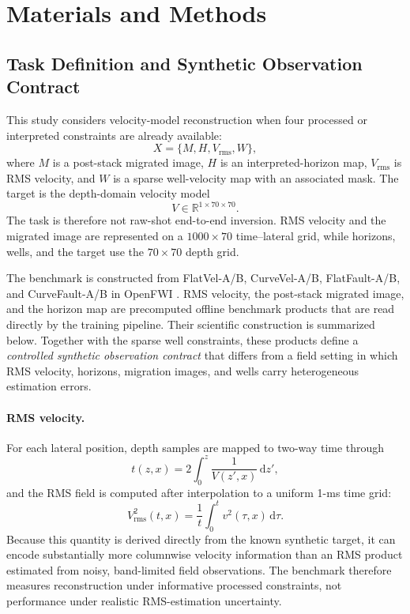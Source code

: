 \section{Materials and Methods}

\subsection{Task Definition and Synthetic Observation Contract}

This study considers velocity-model reconstruction when four processed or interpreted constraints are already available:
\[
X=\{M,H,V_{\mathrm{rms}},W\},
\]
where $M$ is a post-stack migrated image, $H$ is an interpreted-horizon map, $V_{\mathrm{rms}}$ is RMS velocity, and $W$ is a sparse well-velocity map with an associated mask. The target is the depth-domain velocity model
\[
V\in\mathbb{R}^{1\times70\times70}.
\]
The task is therefore not raw-shot end-to-end inversion. RMS velocity and the migrated image are represented on a $1000\times70$ time--lateral grid, while horizons, wells, and the target use the $70\times70$ depth grid.



The benchmark is constructed from FlatVel-A/B, CurveVel-A/B, FlatFault-A/B, and CurveFault-A/B in OpenFWI \citep{deng2022openfwi}. RMS velocity, the post-stack migrated image, and the horizon map are precomputed offline benchmark products that are read directly by the training pipeline. Their scientific construction is summarized below. Together with the sparse well constraints, these products define a \emph{controlled synthetic observation contract} that differs from a field setting in which RMS velocity, horizons, migration images, and wells carry heterogeneous estimation errors.

\paragraph{RMS velocity.}
For each lateral position, depth samples are mapped to two-way time through
\begin{equation}
t(z,x)=2\int_0^z \frac{1}{V(z',x)}\,\mathrm{d}z',
\end{equation}
and the RMS field is computed after interpolation to a uniform 1-ms time grid:
\begin{equation}
V_{\mathrm{rms}}^2(t,x)=\frac{1}{t}\int_0^t v^2(\tau,x)\,\mathrm{d}\tau.
\end{equation}
Because this quantity is derived directly from the known synthetic target, it can encode substantially more columnwise velocity information than an RMS product estimated from noisy, band-limited field observations. The benchmark therefore measures reconstruction under informative processed constraints, not performance under realistic RMS-estimation uncertainty.

